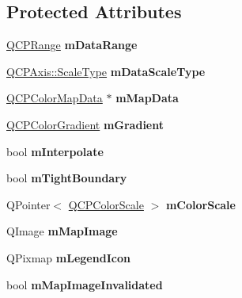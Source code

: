 \subsection*{Protected Attributes}
\begin{DoxyCompactItemize}
\item 
\hyperlink{class_q_c_p_range}{Q\+C\+P\+Range} {\bfseries m\+Data\+Range}\hypertarget{class_q_c_p_color_map_ab87609621d16cd3e9d52ad070b327b08}{}\label{class_q_c_p_color_map_ab87609621d16cd3e9d52ad070b327b08}

\item 
\hyperlink{class_q_c_p_axis_a36d8e8658dbaa179bf2aeb973db2d6f0}{Q\+C\+P\+Axis\+::\+Scale\+Type} {\bfseries m\+Data\+Scale\+Type}\hypertarget{class_q_c_p_color_map_ab28a4b2def408f83b9818799d5f18446}{}\label{class_q_c_p_color_map_ab28a4b2def408f83b9818799d5f18446}

\item 
\hyperlink{class_q_c_p_color_map_data}{Q\+C\+P\+Color\+Map\+Data} $\ast$ {\bfseries m\+Map\+Data}\hypertarget{class_q_c_p_color_map_a8709272aa8f0be3ca111bf3866806f8b}{}\label{class_q_c_p_color_map_a8709272aa8f0be3ca111bf3866806f8b}

\item 
\hyperlink{class_q_c_p_color_gradient}{Q\+C\+P\+Color\+Gradient} {\bfseries m\+Gradient}\hypertarget{class_q_c_p_color_map_aab77fe9a8df6f0486ab3507cc5f278fa}{}\label{class_q_c_p_color_map_aab77fe9a8df6f0486ab3507cc5f278fa}

\item 
bool {\bfseries m\+Interpolate}\hypertarget{class_q_c_p_color_map_af77e5eba9a844592648edeb6fbe834f1}{}\label{class_q_c_p_color_map_af77e5eba9a844592648edeb6fbe834f1}

\item 
bool {\bfseries m\+Tight\+Boundary}\hypertarget{class_q_c_p_color_map_ac2e9425fe4381b496726e1c09f978302}{}\label{class_q_c_p_color_map_ac2e9425fe4381b496726e1c09f978302}

\item 
Q\+Pointer$<$ \hyperlink{class_q_c_p_color_scale}{Q\+C\+P\+Color\+Scale} $>$ {\bfseries m\+Color\+Scale}\hypertarget{class_q_c_p_color_map_a95b4100bacc3387652c988b071ec9db7}{}\label{class_q_c_p_color_map_a95b4100bacc3387652c988b071ec9db7}

\item 
Q\+Image {\bfseries m\+Map\+Image}\hypertarget{class_q_c_p_color_map_a66110813b42eca78b64095b2a1f285a0}{}\label{class_q_c_p_color_map_a66110813b42eca78b64095b2a1f285a0}

\item 
Q\+Pixmap {\bfseries m\+Legend\+Icon}\hypertarget{class_q_c_p_color_map_ada522988db02cb531767d38c5029ef60}{}\label{class_q_c_p_color_map_ada522988db02cb531767d38c5029ef60}

\item 
bool {\bfseries m\+Map\+Image\+Invalidated}\hypertarget{class_q_c_p_color_map_ac9aea6a5c193d7fa866bc7b26e79ef2c}{}\label{class_q_c_p_color_map_ac9aea6a5c193d7fa866bc7b26e79ef2c}

\end{DoxyCompactItemize}
